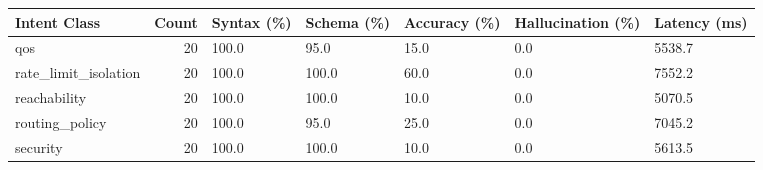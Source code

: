 \begin{tabular}{lrlllll}
\toprule
Intent Class & Count & Syntax (\%) & Schema (\%) & Accuracy (\%) & Hallucination (\%) & Latency (ms) \\
\midrule
qos & 20 & 100.0 & 95.0 & 15.0 & 0.0 & 5538.7 \\
rate\_limit\_isolation & 20 & 100.0 & 100.0 & 60.0 & 0.0 & 7552.2 \\
reachability & 20 & 100.0 & 100.0 & 10.0 & 0.0 & 5070.5 \\
routing\_policy & 20 & 100.0 & 95.0 & 25.0 & 0.0 & 7045.2 \\
security & 20 & 100.0 & 100.0 & 10.0 & 0.0 & 5613.5 \\
\bottomrule
\end{tabular}
